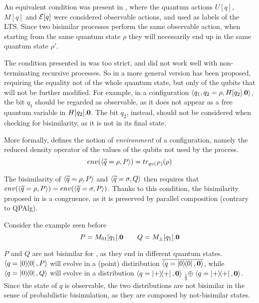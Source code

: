 An equivalent condition was present in \cite{yingAlgebraQuantumProcesses2010}, where the quantum actions $U[q]$, $M[q]$ and $\mathcal{E}[q]$ were considered observable actions, and used as labels of the LTS. Since two bisimilar processes perform the same observable action, when starting from the same quantum state $\rho$ they will necessarily end up in the same quantum state $\rho'$.

The condition presented in \cite{fengProbabilisticBisimulationsQuantum2007} was too strict, and did not work well with non-terminating recursive processes. So in \cite{fengBisimulationQuantumProcesses2012} a more general version has been proposed, requiring the equality not of the whole quantum state, but only of the qubits that will not be further modified. For example, in a configuration $\langle q_1, q_2 = \rho, H[q_2].\mathbf{0}\rangle$, the bit $q_1$ should be regarded as observable, as it does not appear as a free quantum variable in $H[q_2].\mathbf{0}$. The bit $q_2$, instead, should not be considered when checking for bisimilarity, as it is not in its final state.

More formally, \cite{fengBisimulationQuantumProcesses2012} defines the notion of \textit{environment} of a configuration, namely the reduced density operator of the values of the qubits not used by the process.
\[env(\langle\widetilde{q} = \rho, P\rangle) = tr_{qv(P)}(\rho)\]


The bisimilarity of $\langle\widetilde{q} = \rho, P\rangle $ and $\langle\widetilde{q} = 	\sigma, Q\rangle$ then requires that 
$env(\langle\widetilde{q} = \rho, P\rangle) = env(\langle\widetilde{q} = \sigma, P\rangle)$. Thanks to this condition, the bisimilarity proposed in \cite{fengBisimulationQuantumProcesses2012} is a congruence, as it is preserved by parallel composition (contrary to QPAlg).


Consider the example seen before 
\[P = M_{01}[q_1].\mathbf{0} \qquad Q = M_\pm[q_1].\mathbf{0} \]

$P$ and $Q$ are not bisimilar for \cite{fengProbabilisticBisimulationsQuantum2007, fengBisimulationQuantumProcesses2012, dengOpenBisimulationQuantum2012} , as they end in different quantum states. $\langle q = \ket{0}\!\!\bra{0}, P\rangle$ will evolve in a (point) distiribution $\overline{\langle q = \ket{0}\!\!\bra{0}, \mathbf{0}\rangle}$, while $\langle q = \ket{0}\!\!\bra{0}, Q\rangle$ will evolve in a distribution $\confw{q = \proj{+}, \nil} \psum{\frac{1}{2}} \confw{q = \proj{+}, \nil}$. Since the state of $q$ is observable, the two distributions are not bisimilar in the sense of probabilistic bisimulation, as they are composed by not-bisimilar states.

